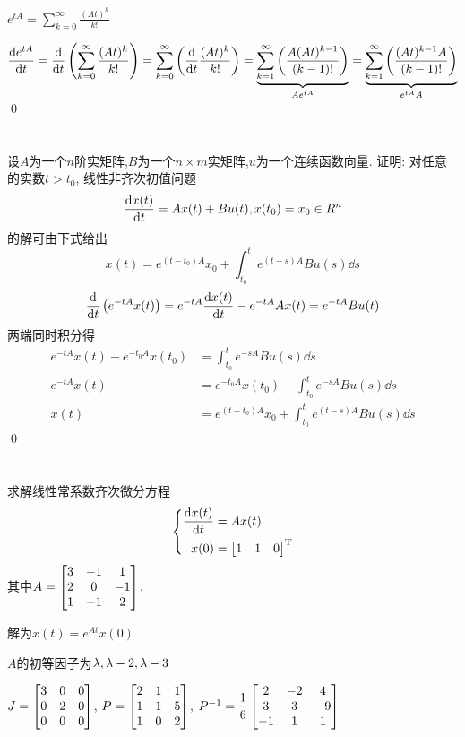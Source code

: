 \documentclass{matrix-homework}
\begin{document}
\answer
$\displaystyle e^{tA}=\sum_{k=0}^{\infty}\frac{(At)^k}{k!}$

$\displaystyle \dfrac{\mathrm{d} e^{tA}}{\mathrm{d} t}
    = \dfrac{\mathrm{d} }{\mathrm{d} t}\left(\sum_{k=0}^{\infty}\frac{(At)^k}{k!}\right)
    = \sum_{k=0}^{\infty}\left(\dfrac{\mathrm{d} }{\mathrm{d} t}\frac{(At)^k}{k!}\right)
    = \underbrace{\sum_{k=1}^{\infty}\left(\frac{A(At)^{k-1}}{(k-1)!}\right)}_{Ae^{tA}}
    = \underbrace{\sum_{k=1}^{\infty}\left(\frac{(At)^{k-1}A}{(k-1)!}\right)}_{e^{tA}A} $
\qed

\newpage
\section{}
设$A$为一个$n$阶实矩阵,$B$为一个$n\times m$实矩阵,$u$为一个连续函数向量. 证明: 对任意的实数$t>t_0$, 线性非齐次初值问题
$$\dfrac{\mathrm{d} x(t)}{\mathrm{d} t}=Ax(t)+Bu(t), x(t_0)=x_0\in R^n$$
的解可由下式给出
$$x(t)=e^{(t-t_0)A}x_0+\int_{t_0}^{t}e^{(t-s)A}Bu(s)\dd s$$
\answer
\[
    \dfrac{\mathrm{d} }{\mathrm{d} t}\left(e^{-tA}x(t)\right)=e^{-tA}\dfrac{\mathrm{d} x(t)}{\mathrm{d} t}-e^{-tA}Ax(t)= e^{-tA}Bu(t)
\]
两端同时积分得
\begin{align*}
    e^{-tA}x(t) - e^{-t_0A}x(t_0) & = \int_{t_0}^{t}e^{-sA}Bu(s)\dd s                    \\
    e^{-tA}x(t)                   & = e^{-t_0A}x(t_0)+\int_{t_0}^{t}e^{-sA}Bu(s)\dd s    \\
    x(t)                          & = e^{(t-t_0)A}x_0+\int_{t_0}^{t}e^{(t-s)A}Bu(s)\dd s
\end{align*}
\qed

\newpage
\section{}
求解线性常系数齐次微分方程
\[
    \left\{
    \begin{aligned}
        \dfrac{\mathrm{d} x(t)}{\mathrm{d} t} & = Ax(t)               \\
        x(0)          & = \begin{bmatrix}1 & 1 & 0\end{bmatrix}^{\mathrm{T}}
    \end{aligned}
    \right.
\]
其中$A=\begin{bmatrix}3&-1&1\\2&0&-1\\1&-1&2\end{bmatrix}$.

\answer
解为$x(t)=e^{At}x(0)$

$A$的初等因子为$\lambda,\lambda-2,\lambda-3$

$J=\begin{bmatrix}3 &0 &0\\ 0&2 & 0 \\ 0 & 0 & 0\end{bmatrix}$, $P=\begin{bmatrix}2 & 1 & 1 \\ 1 & 1 & 5\\ 1&0&2\end{bmatrix}$, $P^{-1}=\dfrac{1}{6}\begin{bmatrix}2&-2&4\\ 3&3&-9\\ -1&1&1\end{bmatrix}$
\end{document}
